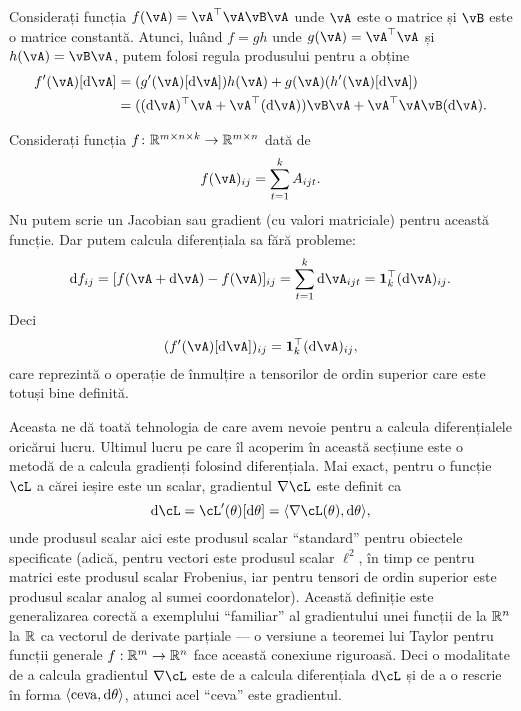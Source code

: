 \documentclass[../../book-main_ro.tex]{subfiles}
\begin{document}
\begin{example}
    Considerați funcția \(f(\vA) = \vA^{\top}\vA\vB\vA\) unde \(\vA\) este o matrice și \(\vB\) este o matrice constantă. Atunci, luând \(f = gh\) unde \(g(\vA) = \vA^{\top}\vA\) și \(h(\vA) = \vB\vA\), putem folosi regula produsului pentru a obține
    \begin{align}
        f^{\prime}(\vA)[\odif{\vA}]
        &= (g^{\prime}(\vA)[\odif{\vA}])h(\vA) + g(\vA)(h^{\prime}(\vA)[\odif{\vA}]) \\
        &= ((\odif{\vA})^{\top}\vA + \vA^{\top}(\odif{\vA}))\vB\vA + \vA^{\top}\vA\vB(\odif{\vA}).
    \end{align}
\end{example}

\begin{example}
    Considerați funcția \(f \colon \mathbb{R}^{m \times n \times k} \to \mathbb{R}^{m \times n}\) dată de
    \begin{equation}
        f(\vA)_{ij} = \sum_{t = 1}^{k}A_{ijt}.
    \end{equation}
    Nu putem scrie un Jacobian sau gradient (cu valori matriciale) pentru această funcție. Dar putem calcula diferențiala sa fără probleme:
    \begin{equation}
        \odif{f}_{ij} = [f(\vA + \odif{\vA}) - f(\vA)]_{ij} = \sum_{t = 1}^{k}\odif{\vA}_{ijt} = \vone_{k}^{\top}(\odif{\vA})_{ij}.
    \end{equation}
    Deci
    \begin{equation}
        (f^{\prime}(\vA)[\odif{\vA}])_{ij} = \vone_{k}^{\top}(\odif{\vA})_{ij},
    \end{equation}
    care reprezintă o operație de înmulțire a tensorilor de ordin superior care este totuși bine definită.
\end{example}

Aceasta ne dă toată tehnologia de care avem nevoie pentru a calcula diferențialele oricărui lucru.
Ultimul lucru pe care îl acoperim în această secțiune este o metodă de a calcula gradienți folosind diferențiala. Mai exact, pentru o funcție \(\cL\) a cărei ieșire este un scalar, gradientul \(\nabla \cL\) este definit ca
\begin{equation}
    \odif{\cL} = \cL^{\prime}(\theta)[\odif{\theta}] = \ip{\nabla \cL(\theta)}{\odif{\theta}},
\end{equation}
unde produsul scalar aici este produsul scalar ``standard'' pentru obiectele specificate (adică, pentru vectori este produsul scalar \(\ell^{2}\), în timp ce pentru matrici este produsul scalar Frobenius, iar pentru tensori de ordin superior este produsul scalar analog al sumei coordonatelor).
Această definiție este generalizarea corectă a exemplului ``familiar'' al gradientului unei funcții de la $\mathbb{R}^n$ la $\mathbb{R}$ ca vectorul de derivate parțiale --- o versiune a teoremei lui Taylor pentru funcții generale $f : \mathbb{R}^m \to \mathbb{R}^n$ face această conexiune riguroasă.
Deci o modalitate de a calcula gradientul \(\nabla \cL\) este de a calcula diferențiala \(\odif{\cL}\) și de a o rescrie în forma \(\ip{\text{ceva}}{\odif{\theta}}\), atunci acel ``ceva'' este gradientul.
\end{document}
